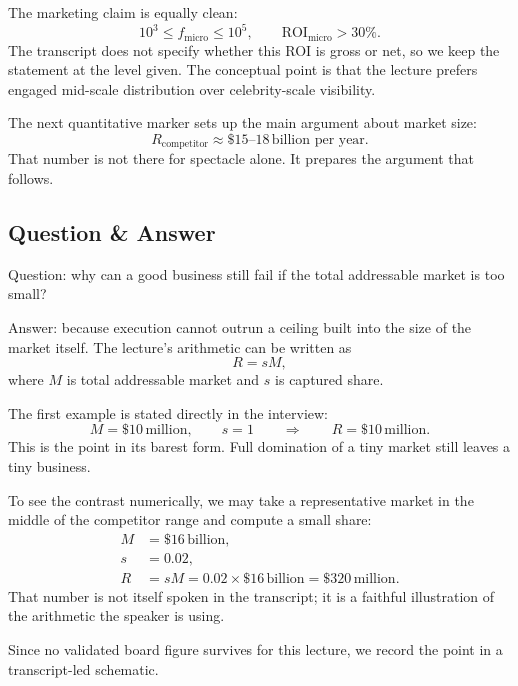 The marketing claim is equally clean:
\begin{equation}
10^3 \le f_{\text{micro}} \le 10^5, \qquad
\mathrm{ROI}_{\text{micro}} > 30\%.
\end{equation}
The transcript does not specify whether this ROI is gross or net, so we keep the statement at the level given. The conceptual point is that the lecture prefers engaged mid-scale distribution over celebrity-scale visibility.

The next quantitative marker sets up the main argument about market size:
\begin{equation}
R_{\text{competitor}} \approx \$15\text{--}18\,\text{billion per year}.
\end{equation}
That number is not there for spectacle alone. It prepares the argument that follows.

\subsection{Question \& Answer}

Question: why can a good business still fail if the total addressable market is too small?

Answer: because execution cannot outrun a ceiling built into the size of the market itself. The lecture's arithmetic can be written as
\begin{equation}
R = sM,
\end{equation}
where \(M\) is total addressable market and \(s\) is captured share.

The first example is stated directly in the interview:
\begin{equation}
M=\$10\,\text{million}, \qquad s=1 \qquad \Rightarrow \qquad R=\$10\,\text{million}.
\end{equation}
This is the point in its barest form. Full domination of a tiny market still leaves a tiny business.

To see the contrast numerically, we may take a representative market in the middle of the competitor range and compute a small share:
\begin{align}
M &= \$16\,\text{billion}, \\
s &= 0.02, \\
R &= sM = 0.02\times \$16\,\text{billion} = \$320\,\text{million}.
\end{align}
That number is not itself spoken in the transcript; it is a faithful illustration of the arithmetic the speaker is using.

Since no validated board figure survives for this lecture, we record the point in a transcript-led schematic.

